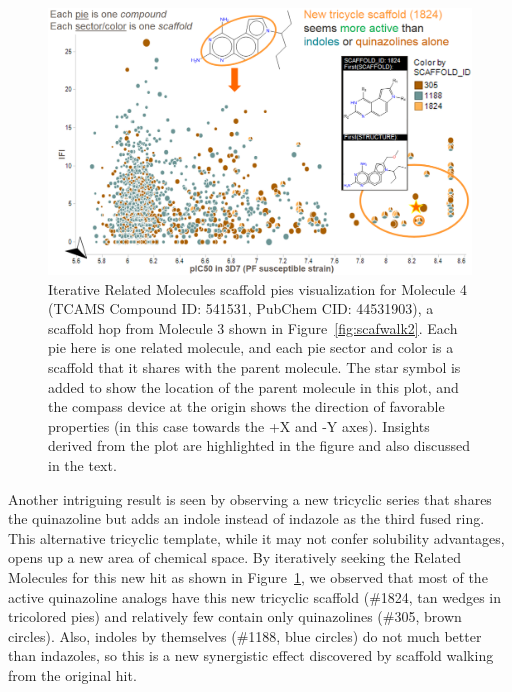 \documentclass[journal=jacsat,manuscript=article]{achemso}
\newcommand*\fref[1]{Figure~\ref{fig:#1}}
\begin{document}
\begin{figure}
\includegraphics[width=5.5in]{fig/mol3_RGtool_scafpie_iter.png}
\caption{Iterative Related Molecules scaffold pies visualization for Molecule 4 (TCAMS Compound ID: 541531, PubChem CID: 44531903), a scaffold hop from Molecule 3 shown in \fref{scafwalk2}. Each pie here is one related molecule, and each pie sector and color is a scaffold that it shares with the parent molecule. The star symbol is added to show the location of the parent molecule in this plot, and the compass device at the origin shows the direction of favorable properties (in this case towards the +X and -Y axes). Insights derived from the plot are highlighted in the figure and also discussed in the text.}
\label{fig:scafwalk3}
\end{figure}

Another intriguing result is seen by observing a new tricyclic series that shares the quinazoline but adds an indole instead of indazole as the third fused ring. This alternative tricyclic template, while it may not confer solubility advantages, opens up a new area of chemical space. By iteratively seeking the Related Molecules for this new hit as shown in \fref{scafwalk3}, we observed that most of the active quinazoline analogs have this new tricyclic scaffold (\#1824, tan wedges in tricolored pies) and relatively few contain only quinazolines (\#305, brown circles). Also, indoles by themselves (\#1188, blue circles) do not much better than indazoles, so this is a new synergistic effect discovered by scaffold walking from the original hit.            
\end{document}
